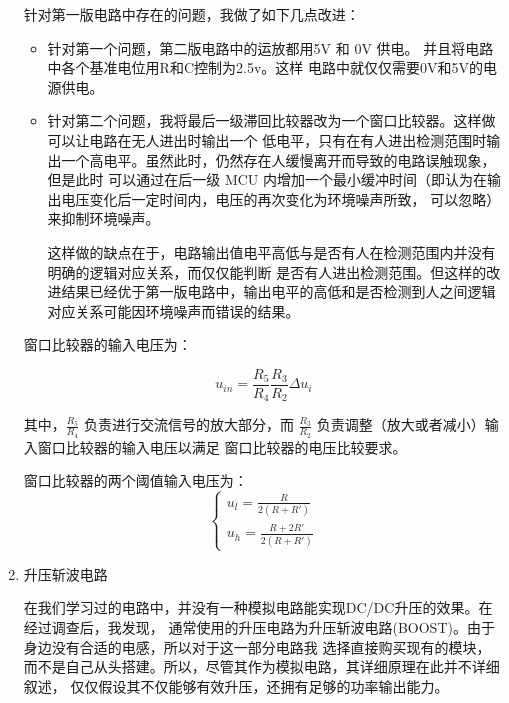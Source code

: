 \documentclass{article}
\begin{document}
\begin{spacing}{1.5}
\begin{enumerate}
        针对第一版电路中存在的问题，我做了如下几点改进：
        \begin{itemize}
            \item 针对第一个问题，第二版电路中的运放都用5V 和 0V 供电。
            并且将电路中各个基准电位用R和C控制为2.5v。这样
            电路中就仅仅需要0V和5V的电源供电。
            
            \item 针对第二个问题，我将最后一级滞回比较器改为一个窗口比较器。这样做可以让电路在无人进出时输出一个
            低电平，只有在有人进出检测范围时输出一个高电平。虽然此时，仍然存在人缓慢离开而导致的电路误触现象，但是此时
            可以通过在后一级 MCU 内增加一个最小缓冲时间（即认为在输出电压变化后一定时间内，电压的再次变化为环境噪声所致，
            可以忽略）来抑制环境噪声。

            这样做的缺点在于，电路输出值电平高低与是否有人在检测范围内并没有明确的逻辑对应关系，而仅仅能判断
            是否有人进出检测范围。但这样的改进结果已经优于第一版电路中，输出电平的高低和是否检测到人之间逻辑
            对应关系可能因环境噪声而错误的结果。

        \end{itemize}

        窗口比较器的输入电压为：

        \begin{equation}
            u_{in} = \frac{R_5}{R_4} \frac{R_3}{R_2} \Delta u_i
        \end{equation}

        其中，$\frac{R_5}{R_4}$ 负责进行交流信号的放大部分，而
        $\frac{R_3}{R_2}$ 负责调整（放大或者减小）输入窗口比较器的输入电压以满足
        窗口比较器的电压比较要求。

        窗口比较器的两个阈值输入电压为：
        \begin{equation}
            \begin{cases}
                u_{l} = \frac{R}{2(R + R')} \\
                u_{h} = \frac{R+2R'}{2(R + R')} 
            \end{cases}
        \end{equation}


        \item 升压斩波电路

        在我们学习过的电路中，并没有一种模拟电路能实现DC/DC升压的效果。在经过调查后，我发现，
        通常使用的升压电路为升压斩波电路(BOOST)。由于身边没有合适的电感，所以对于这一部分电路我
        选择直接购买现有的模块，而不是自己从头搭建。所以，尽管其作为模拟电路，其详细原理在此并不详细叙述，
        仅仅假设其不仅能够有效升压，还拥有足够的功率输出能力。


\end{enumerate}
\end{spacing}
\end{document}
